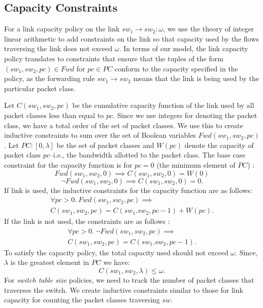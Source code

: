 \subsection{Capacity Constraints}
For a link capacity policy on the link $sw_1 \rightarrow sw_2: \omega$, we use the theory of integer linear arithmetic to add constraints on the link so that capacity used by the flows traversing the link does not exceed $\omega$. 
In terms of our model, the link capacity policy translates to constraints that
ensure that the tuples of the form $(sw_1, sw_2, pc) \in Fwd$ for $pc \in PC$ conform to the capacity specified in the policy, 
as the forwarding rule $sw_1 \rightarrow sw_2$ means that the link is being used by the particular packet class.
 
Let $C(sw_1,sw_2,pc)$ be the cumulative capacity function of the link used by all packet classes less than equal to $pc$. Since we use integers for denoting the packet class, we have a total order of the set of packet classes. We use this to create inductive constraints to sum over the set of Boolean variables $Fwd(sw_1, sw_2,pc)$. Let $PC : [0, \lambda]$ be the set of packet classes and $W(pc)$ 
denote the capacity of packet class $pc$--i.e., the bandwidth allotted to the packet class. 
The base case constraint for the capacity function is for $pc = 0$ (the minimum element of $PC$) :
\begin{equation}
	Fwd(sw_1, sw_2, 0) \implies C(sw_1, sw_2, 0) = W(0)
\end{equation}
\begin{equation}
	\neg Fwd(sw_1, sw_2, 0) \implies C(sw_1, sw_2, 0) = 0.
\end{equation} 
If link is used, the inductive constraints for the capacity function are as follows:
\begin{multline}
	\forall pc > 0.~Fwd(sw_1,sw_2,pc) \implies \\ C(sw_1, sw_2, pc) =  C(sw_1. sw_2, pc - 1) + W(pc).
\end{multline}
If the link is not used, the constraints are as follows : 
\begin{multline}
\forall pc > 0.~\neg Fwd(sw_1,sw_2,pc) \implies \\ C(sw_1, sw_2, pc) =  C(sw_1. sw_2, pc - 1).
\end{multline}
To satisfy the capacity policy, the total capacity used should not exceed $\omega$. 
Since, $\lambda$ is the greatest element in $PC$ we have:
\begin{equation}
	C(sw_1, sw_2, \lambda) \leq \omega.
\end{equation} 
For \emph{switch table size} policies, we need to track the number of packet classes that traverses the switch.
We create inductive constraints similar to those for link capacity for counting the packet classes traversing $sw$.
